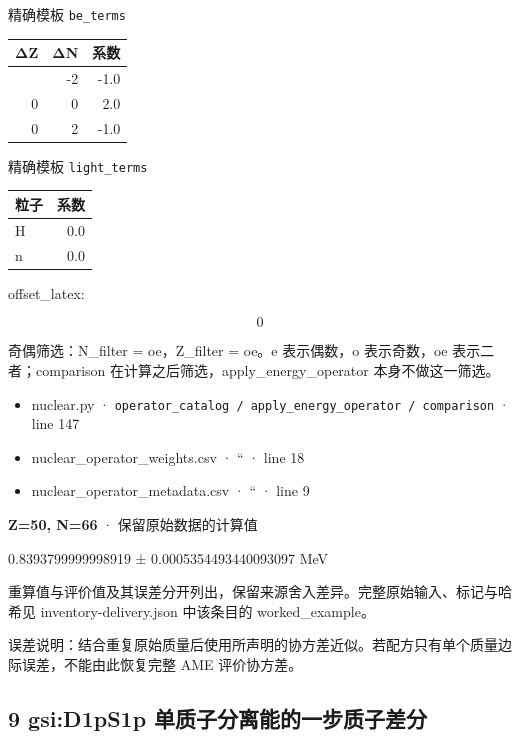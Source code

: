 \documentclass[
  11pt,
  letterpaper,
]{article}
\providecommand{\tightlist}{%
  \setlength{\itemsep}{0pt}\setlength{\parskip}{0pt}}
\begin{document}
精确模板 \texttt{be\_terms}

\begin{longtable}[]{@{}rrr@{}}
\toprule\noalign{}
ΔZ & ΔN & 系数 \\
\midrule\noalign{}
\endhead
\bottomrule\noalign{}
\endlastfoot
0 & -2 & -1.0 \\
0 & 0 & 2.0 \\
0 & 2 & -1.0 \\
\end{longtable}

精确模板 \texttt{light\_terms}

\begin{longtable}[]{@{}lr@{}}
\toprule\noalign{}
粒子 & 系数 \\
\midrule\noalign{}
\endhead
\bottomrule\noalign{}
\endlastfoot
H & 0.0 \\
n & 0.0 \\
\end{longtable}

offset\_latex:

\[
0
\]

奇偶筛选：N\_filter = oe，Z\_filter = oe。e 表示偶数，o 表示奇数，oe
表示二者；comparison 在计算之后筛选，apply\_energy\_operator
本身不做这一筛选。

\begin{itemize}
\tightlist
\item
  nuclear.py ·
  \texttt{operator\_catalog\ /\ apply\_energy\_operator\ /\ comparison}
  · line 147
\item
  nuclear\_operator\_weights.csv · `` · line 18
\item
  nuclear\_operator\_metadata.csv · `` · line 9
\end{itemize}

\textbf{Z=50, N=66} · 保留原始数据的计算值

0.8393799999998919 ± 0.0005354493440093097 MeV

重算值与评价值及其误差分开列出，保留来源舍入差异。完整原始输入、标记与哈希见
inventory-delivery.json 中该条目的 worked\_example。

误差说明：结合重复原始质量后使用所声明的协方差近似。若配方只有单个质量边际误差，不能由此恢复完整
AME 评价协方差。

\subsection{9 gsi:D1pS1p
单质子分离能的一步质子差分}\label{gsid1ps1p-ux5355ux8d28ux5b50ux5206ux79bbux80fdux7684ux4e00ux6b65ux8d28ux5b50ux5deeux5206}
\end{document}
